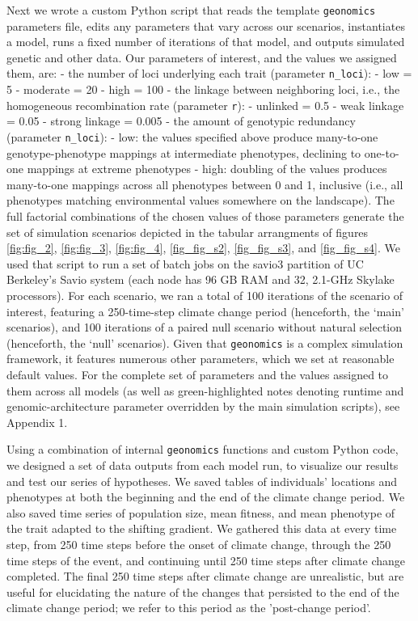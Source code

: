 \documentclass[9pt,twocolumn,twoside,lineno]{pnas-new}
\begin{document}
{Next we wrote a custom Python script that reads the template \texttt{geonomics}
parameters file, edits any parameters that vary 
across our scenarios, instantiates a model, runs a fixed number of iterations 
of that model, and outputs simulated genetic and other data. 
Our parameters of interest, and the values we assigned them, are:
 - the number of loci underlying each trait (parameter \texttt{n\_loci}):
   - low = 5
   - moderate = 20
   - high = 100
 - the linkage between neighboring loci, i.e., the homogeneous recombination rate (parameter \texttt{r}):
   - unlinked = 0.5
   - weak linkage = 0.05
   - strong linkage = 0.005
 - the amount of genotypic redundancy (parameter \texttt{n\_loci}):
   - low: the values specified above produce many-to-one genotype-phenotype mappings at intermediate phenotypes, declining to one-to-one mappings at extreme phenotypes
   - high: doubling of the values produces many-to-one mappings across all phenotypes between 0 and 1, inclusive (i.e., all phenotypes matching environmental values somewhere on the landscape).
The full factorial combinations of the chosen values of those parameters generate the set
of simulation scenarios depicted in the tabular arrangments of figures
\ref{fig:fig_2}, \ref{fig:fig_3}, \ref{fig:fig_4}, \ref{fig_fig_s2}, \ref{fig_fig_s3}, and \ref{fig_fig_s4}.
We used that script to run a set of batch jobs on the 
savio3 partition of UC Berkeley’s Savio system (each node has 96 GB RAM and 32, 
2.1-GHz Skylake processors). For each scenario, we ran a total of 100 iterations of 
the scenario of interest, featuring a 250-time-step climate change period (henceforth, 
the ‘main’ scenarios), and 100 iterations of a paired null scenario without natural 
selection (henceforth, the ‘null’ scenarios). 
Given that \texttt{geonomics} is a complex simulation framework, it features numerous other 
parameters, which we set at reasonable default values.
For the complete set of parameters and the values 
assigned to them across all models
(as well as green-highlighted notes denoting runtime and genomic-architecture
parameter overridden by the main simulation scripts), see Appendix 1.

Using a combination of internal \texttt{geonomics} functions and custom Python code, we 
designed a set of data outputs from each model run, to visualize our
results and test our series of hypotheses.
We saved tables of individuals’ locations and phenotypes at both
the beginning and the end of the climate change period. We also saved time 
series of population size, mean fitness, and mean phenotype of the trait adapted to 
the shifting gradient. We gathered this data at every time step, from 250 time steps 
before the onset of climate change, through the 250 time steps of the event, and 
continuing until 250 time steps after climate change completed.
The final 250 time steps after climate change are unrealistic, but are useful
for elucidating the nature of the changes that persisted to the end of the climate change period;
we refer to this period as the 'post-change period'.

}
\end{document}
